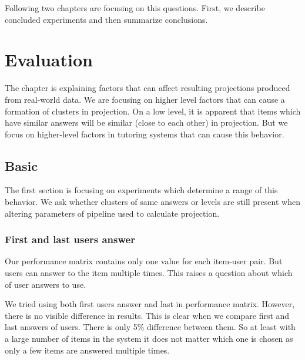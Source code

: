 \documentclass[
  printed, %
  table,   %
  nolof,     %
  nolot,     %
  color,
  final,
  nocover
]{fithesis3}
\begin{document}

Following two chapters are focusing on this questions. First, we describe concluded experiments and then summarize conclusions.


\chapter{Evaluation}\label{evaluation}

The chapter is explaining factors that can affect resulting projections produced from real-world data. We are focusing on higher level factors that can cause a formation of clusters in projection. On a low level, it is apparent that items which have similar answers will be similar (close to each other) in projection. But we focus on higher-level factors in tutoring systems that can cause this behavior.


\section{Basic}\label{evaluation-basic}

The first section is focusing on experiments which determine a range of this behavior. We ask whether clusters of same answers or levels are still present when altering parameters of pipeline used to calculate projection.


\subsection{First and last users answer}\label{first-and-last-users-answer}


Our performance matrix contains only one value for each item-user pair. But users can answer to the item multiple times. This raises a question about which of user answers to use.


We tried using both first users answer and last in performance matrix. However, there is no visible difference in results. This is clear when we compare first and last answers of users. There is only 5\% difference between them. So at least with a large number of items in the system it does not matter which one is chosen as only a few items are answered multiple times.
\end{document}
